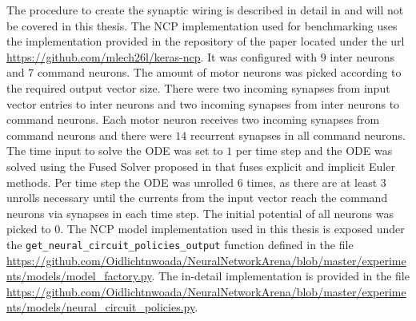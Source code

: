 \documentclass[draft,final]{vutinfth} %
\begin{document}
    The procedure to create the synaptic wiring is described in detail in \cite[p. 3]{NCP} and will not be covered in this thesis.
    The NCP implementation used for benchmarking uses the implementation provided in the repository of the paper \cite{NCP} located under the url \url{https://github.com/mlech26l/keras-ncp}.
    It was configured with $9$ inter neurons and $7$ command neurons. The amount of motor neurons was picked according to the required output vector size.
    There were two incoming synapses from input vector entries to inter neurons and two incoming synapses from inter neurons to command neurons.
    Each motor neuron receives two incoming synapses from command neurons and there were $14$ recurrent synapses in all command neurons.
    The time input to solve the ODE was set to $1$ per time step and the ODE was solved using the Fused Solver proposed in \cite{LTCNetworks} that fuses explicit and implicit Euler methods.
    Per time step the ODE was unrolled $6$ times, as there are at least $3$ unrolls necessary until the currents from the input vector reach the command neurons via synapses in each time step.
    The initial potential of all neurons was picked to $0$.
    The NCP model implementation used in this thesis is exposed under the \texttt{get\_neural\_circuit\_policies\_output} function defined in the file \url{https://github.com/Oidlichtnwoada/NeuralNetworkArena/blob/master/experiments/models/model_factory.py}.
    The in-detail implementation is provided in the file \url{https://github.com/Oidlichtnwoada/NeuralNetworkArena/blob/master/experiments/models/neural_circuit_policies.py}.
\end{document}
